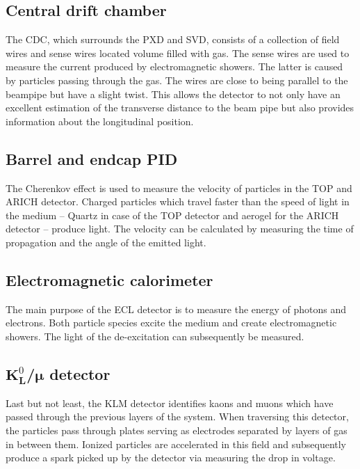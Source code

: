 \subsection{Central drift chamber}
\label{sec:detector_system_tracking_detectors}

The CDC, which surrounds the PXD and SVD, consists of a collection of field wires and sense wires located volume filled with gas. The sense wires are used to measure the current produced by electromagnetic showers. The latter is caused by particles passing through the gas. The wires are close to being parallel to the beampipe but have a slight twist. This allows the detector to not only have an excellent estimation of the transverse distance to the beam pipe but also provides information about the longitudinal position.

\subsection{Barrel and endcap PID}
\label{sec:detector_system_barrel_and_endcap_pid}

The Cherenkov effect is used to measure the velocity of particles in the TOP and ARICH detector. Charged particles which travel faster than the speed of light in the medium -- Quartz in case of the TOP detector and aerogel for the ARICH detector -- produce light. The velocity can be calculated by measuring the time of propagation and the angle of the emitted light.

\subsection{Electromagnetic calorimeter}
\label{sec:detector_system_electromagnetic_calorimeter}

The main purpose of the ECL detector is to measure the energy of photons and electrons. Both particle species excite the medium and create electromagnetic showers. The light of the de-excitation can subsequently be measured.

\subsection{$\boldsymbol{K}^0_{\boldsymbol{L}}$/$\boldsymbol{\mu}$ detector}
\label{sec:detector_system_k0lmu}

Last but not least, the KLM detector identifies kaons and muons which have passed through the previous layers of the system. When traversing this detector, the particles pass through plates serving as electrodes separated by layers of gas in between them. Ionized particles are accelerated in this field and subsequently produce a spark picked up by the detector via measuring the drop in voltage.

